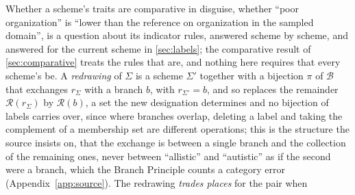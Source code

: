 \noindent Whether a scheme's traits are comparative in disguise, whether ``poor organization'' is ``lower than the reference on organization in the sampled domain'', is a question about its indicator rules, answered scheme by scheme, and answered for the current scheme in \autoref{sec:labels}; the comparative result of \autoref{sec:comparative} treats the rules that are, and nothing here requires that every scheme's be. A \emph{redrawing} of $\Sigma$ is a scheme $\Sigma'$ together with a bijection $\pi$ of $\mathcal{B}$ that exchanges $r_\Sigma$ with a branch $b$, with $r_{\Sigma'} = b$, and so replaces the remainder $\mathcal{R}(r_\Sigma)$ by $\mathcal{R}(b)$, a set the new designation determines and no bijection of labels carries over, since where branches overlap, deleting a label and taking the complement of a membership set are different operations; this is the structure the source insists on, that the exchange is between a single branch and the collection of the remaining ones, never between ``allistic'' and ``autistic'' as if the second were a branch, which the Branch Principle counts a category error (Appendix~\ref{app:source}). The redrawing \emph{trades places} for the pair when
